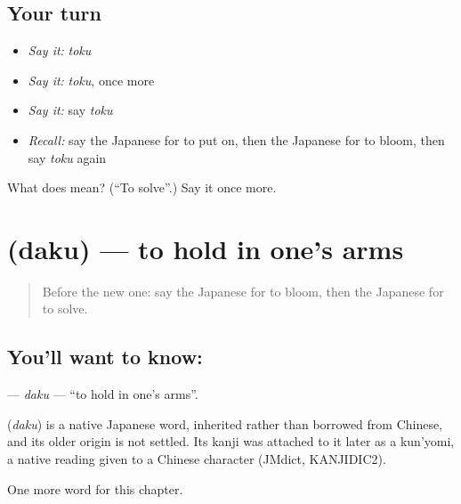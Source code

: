 \subsection*{Your turn}
\begin{itemize}
\raggedright
  \item \emph{Say it:} \emph{toku}
  \item \emph{Say it:} \emph{toku}, once more
  \item \emph{Say it:} say \emph{toku}
  \item \emph{Recall:} say the Japanese for to put on, then the Japanese for to bloom, then say \emph{toku} again
\end{itemize}

\begin{tcolorbox}[breakable,colback=teal!4,colframe=teal!35!black,title={Before you move on}]
What does  mean? (\textquotedblleft{}To solve\textquotedblright{}.) Say it once more.
\end{tcolorbox}
\section[\texorpdfstring{\ja{だく} (daku)}{だく (daku)}]{ (daku) — to hold in one's arms}

\label{lesson:JA-C86-daku}



\begin{quote}
Before the new one: say the Japanese for to bloom, then the Japanese for to solve.
\end{quote}

\subsection*{You'll want to know: }
\textbf{} — \emph{daku} — \textquotedblleft{}to hold in one's arms\textquotedblright{}.

\begin{cousinweb}
\textbf{} (\emph{daku}) is a native Japanese word, inherited rather than borrowed from Chinese, and its older origin is not settled. Its kanji was attached to it later as a kun'yomi, a native reading given to a Chinese character (JMdict, KANJIDIC2).
\end{cousinweb}

\begin{grammarlens}[title={What you've built}]
One more word for this chapter.
\end{grammarlens}

